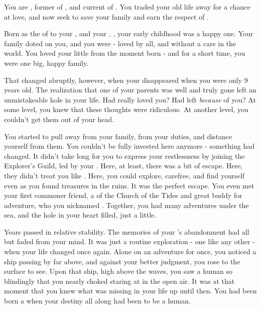 \documentclass[char]{NeptuneBall}
\begin{document}
\name{\cAriel{}}





You are \cAriel{}, former \cAriel{\Prince} of \pAtlantis{}, and current \cAriel{\King} of \pAmerica{}. You traded your old life away for a chance at love, and now seek to save your family and earn the respect of \pAmerica{}.

Born as the \cAriel{\mer} \cAriel{\prince} of \pAtlantis{} to your \cKing{\parent}, \cKing{\King} \cKing{} and your \cQueen{\parent}, \cQueen{\King} \cQueen{}, your early childhood was a happy one. Your family doted on you, and you were \cAriel{\aprince} - loved by all, and without a care in the world. You loved your little \cPrincess{\sibling} \cPrincess{} from the moment \cPrincess{\they} \cPrincess{\were} born - and for a short time, you were one big, happy family.

That changed abruptly, however, when your \cQueen{\parent} disappeared when you were only 9 years old. The realization that one of your parents was well and truly gone left an unmistakeable hole in your life. Had \cQueen{\they} really loved you? Had \cQueen{\they} left \emph{because} of you? At some level, you knew that these thoughts were ridiculous. At another level, you couldn't get them out of your head.

You started to pull away from your family, from your duties, and distance yourself from them. You couldn't be fully invested here anymore - something had changed. It didn't take long for you to express your restlessness by joining the Explorer's Guild, led by your \cPlant{\Uncle} \cPlant{}. Here, at least, there was a bit of escape. Here, they didn't treat you like \cAriel{\aprince}. Here, you could explore, carefree, and find yourself even as you found treasures in the ruins. It was the perfect escape. You even met your first commoner friend, a \cPriest{\priest} of the Church of the Tides and great buddy for adventure, who you nicknamed \cPriest{}. Together, you had many adventures under the sea, and the hole in your heart filled, just a little.

Years passed in relative stability. The memories of your \cQueen{\parent}'s abandonment had all but faded from your mind. It was just a routine exploration - one like any other - when your life changed once again. Alone on an adventure for once, you noticed a ship passing by far above, and against your better judgment, you rose to the surface to see. Upon that ship, high above the waves, you saw a human so blindingly \cEric{\hot} that you nearly choked staring at \cEric{\them} in the open air. It was at that moment that you knew what was missing in your life up until then. You had been born a \cAriel{\mer} when your destiny all along had been to be a human.
\end{document}
